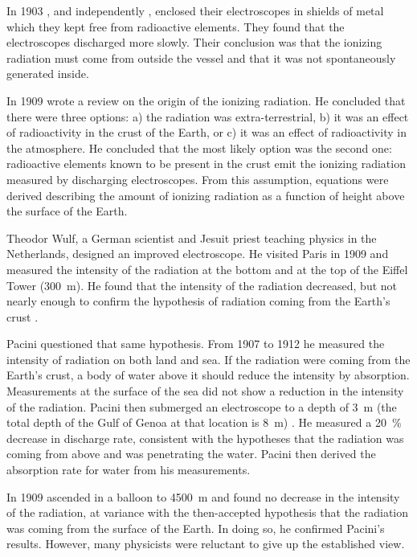 In 1903 \textcite{RutherfordCooke:1903}, and independently
\textcite{McLennanBurton:1903}, enclosed their electroscopes in shields of metal
which they kept free from radioactive elements.  They found that the
electroscopes discharged more slowly.  Their conclusion was that the ionizing
radiation must come from outside the vessel and that it was not spontaneously generated
inside.

In 1909 \textcite{Kurz:1909} wrote a review on the origin of the ionizing
radiation.
He concluded that there were three options: a) the radiation was extra-terrestrial, b)
 it was an effect of radioactivity in the crust of the Earth, or c) it was an effect of radioactivity in the
atmosphere.  He concluded that the most likely option was the second one:
radioactive elements known to be present in the crust emit the ionizing
radiation measured by discharging electroscopes.
From this assumption, equations were derived describing the amount of ionizing
radiation as a function of height above the surface of the Earth.

Theodor Wulf, a German scientist and Jesuit priest teaching physics in the
Netherlands, designed an improved electroscope.  He visited Paris in 1909 and
measured the intensity of the radiation at the bottom and at the top
of the Eiffel Tower (\SI{300}{\meter}).  He found that the intensity of
the radiation decreased, but not nearly enough to confirm the
hypothesis of radiation coming from the Earth's crust \cite{Wulf:1909}.

Pacini questioned that same hypothesis. From 1907 to 1912 he measured the
intensity of radiation on both land and sea. If the radiation were coming from the
Earth's crust, a body of water above it should reduce the intensity by absorption.
Measurements at the surface of the sea did not show a reduction in the intensity of the radiation.  Pacini then
submerged an electroscope to a depth of \SI{3}{\meter} (the total depth of the
Gulf of Genoa at that location is \SI{8}{\meter}) \cite{Pacini:1912}.  He
measured a \SI{20}{\percent} decrease in discharge rate, consistent with the
hypotheses that the radiation was coming from above and was penetrating the
water. Pacini then derived the absorption rate for water from his measurements.

In 1909 \textcite{Gockel:1910} ascended in a balloon to \SI{4500}{\meter} and
found no decrease in the intensity of the radiation, at variance with the
then-accepted hypothesis that the radiation was coming from the surface of the
Earth.  In doing so, he confirmed Pacini's results.  However, many physicists were
reluctant to give up the established view.

